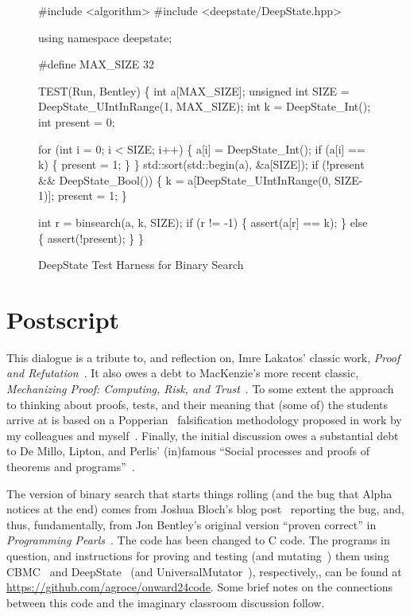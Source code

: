 \documentclass[sigplan]{acmart}
\begin{document}
\begin{figure*}
{\scriptsize
  \begin{code}
\#include <algorithm>
\#include <deepstate/DeepState.hpp>

using namespace deepstate;

\#define MAX\_SIZE 32

TEST(Run, Bentley) \{
  int a[MAX\_SIZE];
  unsigned int SIZE = DeepState\_UIntInRange(1, MAX\_SIZE);
  int k = DeepState\_Int();
  int present = 0;

  for (int i = 0; i < SIZE; i++) \{
    a[i] = DeepState\_Int();
    if (a[i] == k) \{
      present = 1;
    \}
  \}
  std::sort(std::begin(a), \&a[SIZE]);
  if (!present \&\& DeepState\_Bool()) \{
    k = a[DeepState\_UIntInRange(0, SIZE-1)];
    present = 1;
  \}

  int r = binsearch(a, k, SIZE);
  if (r != -1) \{
    assert(a[r] == k);
  \} else \{
    assert(!present);
  \}
\}
\end{code}
}
\caption{DeepState Test Harness for Binary Search}
\label{fig:deepstate}
\end{figure*}

\FloatBarrier

\section{Postscript}



This dialogue is a tribute to, and reflection on, Imre Lakatos' classic
work, \emph{Proof and Refutation}~\cite{lakatos1963proofs}.  It also
owes a debt to MacKenzie's more recent classic, \emph{Mechanizing
  Proof: Computing, Risk, and Trust}~\cite{mackenzie2004mechanizing}.
To some extent the approach to thinking about proofs, tests, and their
meaning that (some of) the students arrive at is based on a Popperian~\cite{Popper} falsification methodology proposed in
work by my colleagues and
myself~\cite{groce2015verified,groce2018verified}.  Finally, the
initial discussion owes a substantial debt to De Millo, Lipton, and
Perlis' (in)famous ``Social processes and proofs of theorems and programs''~\cite{de1979social}.

The version of binary search that starts things rolling (and the bug
that Alpha notices at the end) comes from Joshua Bloch's blog post~\cite{bloch} reporting
the bug, and, thus, fundamentally, from Jon Bentley's original version ``proven
correct'' in \emph{Programming Pearls}~\cite{Pearls}.  The code has
been changed to C code.  The programs in question, and instructions
for proving and testing (and mutating~\cite{MutationSurvey}) them using CBMC~\cite{CBMCp} and
DeepState~\cite{goodman2018deepstate} (and UniversalMutator~\cite{SyntaxUM}), respectively,, can be found at
\url{https://github.com/agroce/onward24code}.  Some brief notes on the
connections between this code and the imaginary classroom discussion follow.
\end{document}
